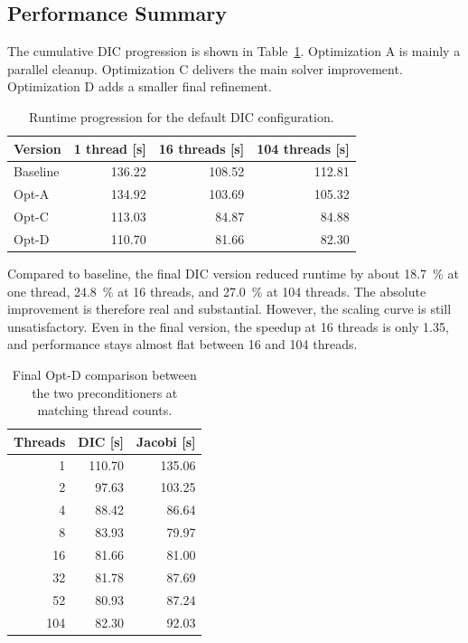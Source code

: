 \documentclass[10pt,firstlineindent,nopartpage,article,accentcolor=tud1b]{tudreport}
\begin{document}
\subsection{Performance Summary}
The cumulative DIC progression is shown in Table~\ref{tab:dic-progression}.
Optimization A is mainly a parallel cleanup. Optimization C delivers the main
solver improvement. Optimization D adds a smaller final refinement.

\begin{table}[H]
\centering
\caption{Runtime progression for the default DIC configuration.}
\label{tab:dic-progression}
\begin{tabular}{lrrr}
\toprule
Version & 1 thread [s] & 16 threads [s] & 104 threads [s] \\
\midrule
Baseline & 136.22 & 108.52 & 112.81 \\
Opt-A    & 134.92 & 103.69 & 105.32 \\
Opt-C    & 113.03 & 84.87  & 84.88 \\
Opt-D    & 110.70 & 81.66  & 82.30 \\
\bottomrule
\end{tabular}
\end{table}

Compared to baseline, the final DIC version reduced runtime by about
\SI{18.7}{\percent} at one thread, \SI{24.8}{\percent} at 16 threads, and
\SI{27.0}{\percent} at 104 threads. The absolute improvement is therefore real
and substantial. However, the scaling curve is still unsatisfactory. Even in
the final version, the speedup at 16 threads is only 1.35, and performance
stays almost flat between 16 and 104 threads.

\begin{table}[H]
\centering
\caption{Final Opt-D comparison between the two preconditioners at matching thread counts.}
\label{tab:final-compare}
\begin{tabular}{rrr}
\toprule
Threads & DIC [s] & Jacobi [s] \\
\midrule
1   & 110.70 & 135.06 \\
2   & 97.63  & 103.25 \\
4   & 88.42  & 86.64 \\
8   & 83.93  & 79.97 \\
16  & 81.66  & 81.00 \\
32  & 81.78  & 87.69 \\
52  & 80.93  & 87.24 \\
104 & 82.30  & 92.03 \\
\bottomrule
\end{tabular}
\end{table}
\end{document}
